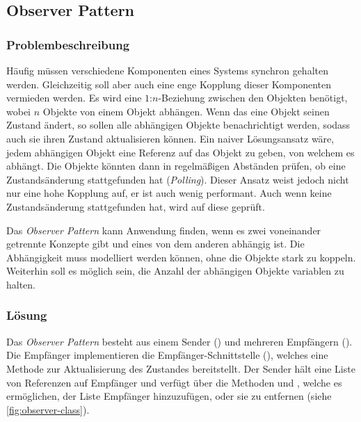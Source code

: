 \subsection{Observer Pattern}


\subsubsection*{Problembeschreibung}

Häufig müssen verschiedene Komponenten eines Systems synchron gehalten werden. Gleichzeitig soll aber auch eine enge Kopplung dieser Komponenten vermieden werden. Es wird eine $1$:$n$-Beziehung zwischen den Objekten benötigt, wobei $n$ Objekte von einem Objekt abhängen. Wenn das eine Objekt seinen Zustand ändert, so sollen alle abhängigen Objekte benachrichtigt werden, sodass auch sie ihren Zustand aktualisieren können. Ein naiver Lösungsansatz wäre, jedem abhängigen Objekt eine Referenz auf das Objekt zu geben, von welchem es abhängt. Die Objekte könnten dann in regelmäßigen Abständen prüfen, ob eine Zustandsänderung stattgefunden hat (\emph{Polling}). Dieser Ansatz weist jedoch nicht nur eine hohe Kopplung auf, er ist auch wenig performant. Auch wenn keine Zustandsänderung stattgefunden hat, wird auf diese geprüft.

Das \emph{Observer Pattern} kann Anwendung finden, wenn es zwei voneinander getrennte Konzepte gibt und eines von dem anderen abhängig ist. Die Abhängigkeit muss modelliert werden können, ohne die Objekte stark zu koppeln. Weiterhin soll es möglich sein, die Anzahl der abhängigen Objekte variablen zu halten. \cite{gamma_design_1995}

\subsubsection*{Lösung}

Das \emph{Observer Pattern} besteht aus einem Sender () und mehreren Empfängern (). Die Empfänger implementieren die Empfänger-Schnittstelle (), welches eine Methode  zur Aktualisierung des Zustandes bereitstellt. Der Sender hält eine Liste von Referenzen auf Empfänger und verfügt über die Methoden  und , welche es ermöglichen, der Liste Empfänger hinzuzufügen, oder sie zu entfernen (siehe \autoref{fig:observer-class}).

